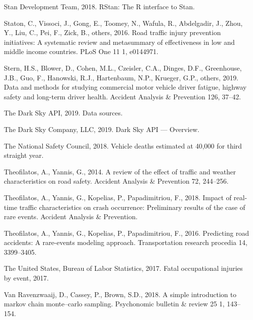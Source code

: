 \documentclass[12pt]{book}
\numberwithin{equation}{chapter}
\begin{document}
\leavevmode\hypertarget{ref-rstancitation}{}%
Stan Development Team, 2018. RStan: The R interface to Stan.

\leavevmode\hypertarget{ref-staton2016road}{}%
Staton, C., Vissoci, J., Gong, E., Toomey, N., Wafula, R., Abdelgadir, J., Zhou, Y., Liu, C., Pei, F., Zick, B., others, 2016. Road traffic injury prevention initiatives: A systematic review and metasummary of effectiveness in low and middle income countries. PLoS One 11 1, e0144971.

\leavevmode\hypertarget{ref-stern2019data}{}%
Stern, H.S., Blower, D., Cohen, M.L., Czeisler, C.A., Dinges, D.F., Greenhouse, J.B., Guo, F., Hanowski, R.J., Hartenbaum, N.P., Krueger, G.P., others, 2019. Data and methods for studying commercial motor vehicle driver fatigue, highway safety and long-term driver health. Accident Analysis \& Prevention 126, 37--42.

\leavevmode\hypertarget{ref-darkskyds}{}%
The Dark Sky API, 2019. Data sources.

\leavevmode\hypertarget{ref-darksky}{}%
The Dark Sky Company, LLC, 2019. Dark Sky API --- Overview.

\leavevmode\hypertarget{ref-nsc2018}{}%
The National Safety Council, 2018. Vehicle deaths estimated at 40,000 for third straight year.

\leavevmode\hypertarget{ref-theofilatos2014review}{}%
Theofilatos, A., Yannis, G., 2014. A review of the effect of traffic and weather characteristics on road safety. Accident Analysis \& Prevention 72, 244--256.

\leavevmode\hypertarget{ref-theofilatos2018impact}{}%
Theofilatos, A., Yannis, G., Kopelias, P., Papadimitriou, F., 2018. Impact of real-time traffic characteristics on crash occurrence: Preliminary results of the case of rare events. Accident Analysis \& Prevention.

\leavevmode\hypertarget{ref-theofilatos2016predicting}{}%
Theofilatos, A., Yannis, G., Kopelias, P., Papadimitriou, F., 2016. Predicting road accidents: A rare-events modeling approach. Transportation research procedia 14, 3399--3405.

\leavevmode\hypertarget{ref-bols}{}%
The United States, Bureau of Labor Statistics, 2017. Fatal occupational injuries by event, 2017.

\leavevmode\hypertarget{ref-van2018simple}{}%
Van Ravenzwaaij, D., Cassey, P., Brown, S.D., 2018. A simple introduction to markov chain monte--carlo sampling. Psychonomic bulletin \& review 25 1, 143--154.
\end{document}
